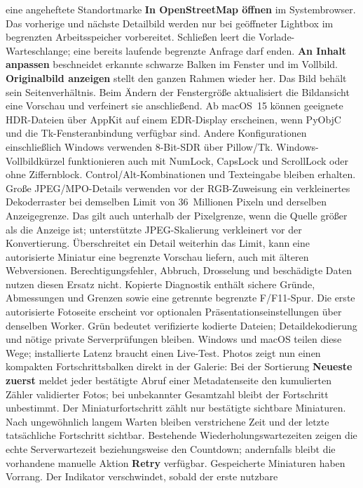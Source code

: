 \documentclass[11pt,a4paper]{article}
\newcommand{\ui}[1]{\textbf{#1}}
\begin{document}
eine angeheftete Standortmarke \ui{In OpenStreetMap öffnen} im Systembrowser.
Das vorherige und nächste Detailbild werden nur bei geöffneter Lightbox im
begrenzten Arbeitsspeicher vorbereitet. Schließen leert die Vorlade-Warteschlange;
eine bereits laufende begrenzte Anfrage darf enden.
\ui{An Inhalt anpassen} beschneidet erkannte schwarze Balken
im Fenster und im Vollbild. \ui{Originalbild anzeigen} stellt den ganzen
Rahmen wieder her. Das Bild behält sein Seitenverhältnis. Beim Ändern der
Fenstergröße aktualisiert die Bildansicht eine Vorschau und verfeinert sie
anschließend. Ab macOS~15 können geeignete HDR-Dateien über AppKit auf einem
EDR-Display erscheinen, wenn PyObjC und die Tk-Fensteranbindung verfügbar
sind. Andere Konfigurationen einschließlich Windows verwenden 8-Bit-SDR
über Pillow/Tk.
Windows-Vollbildkürzel funktionieren auch mit NumLock, CapsLock und ScrollLock
oder ohne Ziffernblock. Control/Alt-Kombinationen und Texteingabe bleiben
erhalten. Große JPEG/MPO-Details verwenden vor der RGB-Zuweisung ein verkleinertes
Dekoderraster bei demselben Limit von 36~Millionen Pixeln und derselben
Anzeigegrenze. Das gilt auch unterhalb der Pixelgrenze, wenn die Quelle größer
als die Anzeige ist; unterstützte JPEG-Skalierung verkleinert vor der Konvertierung.
Überschreitet ein Detail weiterhin das Limit, kann eine
autorisierte Miniatur eine begrenzte Vorschau liefern, auch mit älteren
Webversionen. Berechtigungsfehler, Abbruch, Drosselung und beschädigte Daten
nutzen diesen Ersatz nicht. Kopierte Diagnostik enthält sichere Gründe,
Abmessungen und Grenzen sowie eine getrennte begrenzte F/F11-Spur.
Die erste autorisierte Fotoseite erscheint vor optionalen
Präsentationseinstellungen über denselben Worker. Grün bedeutet verifizierte
kodierte Dateien; Detaildekodierung und nötige private Serverprüfungen bleiben.
Windows und macOS teilen diese Wege; installierte Latenz braucht einen Live-Test.
Photos zeigt nun einen kompakten Fortschrittsbalken direkt in der Galerie:
Bei der Sortierung \ui{Neueste zuerst} meldet jeder bestätigte Abruf einer
Metadatenseite den kumulierten Zähler validierter Fotos; bei unbekannter
Gesamtzahl bleibt der
Fortschritt unbestimmt. Der Miniaturfortschritt zählt nur bestätigte sichtbare
Miniaturen. Nach ungewöhnlich langem Warten bleiben verstrichene Zeit und der
letzte tatsächliche Fortschritt sichtbar. Bestehende Wiederholungswartezeiten
zeigen die echte Serverwartezeit beziehungsweise den Countdown; andernfalls
bleibt die vorhandene manuelle Aktion \ui{Retry} verfügbar. Gespeicherte
Miniaturen haben Vorrang. Der Indikator verschwindet, sobald der erste nutzbare
\end{document}

